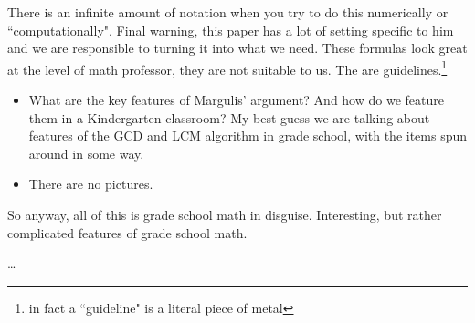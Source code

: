 \documentclass[12pt]{article}
\begin{document}
There is an infinite amount of notation when you try to do this numerically or ``computationally".  Final warning, this paper has a lot of setting specific to him and we are responsible to turning it into what we need. These formulas look great at the level of math professor, they are not suitable to us.  The are guidelines.\footnote{in fact a ``guideline" is a literal piece of metal} 
\begin{itemize}
\item What are the key features of Margulis' argument?  And how do we feature them in a Kindergarten classroom? My best guess we are talking about features of the GCD and LCM algorithm in grade school, with the items spun around in some way.
\item There are no pictures.
\end{itemize}
So anyway, all of this is grade school math in disguise.  Interesting, but rather complicated features of grade school math.





\vfill



\begin{thebibliography}{}

\item \dots 

\end{thebibliography}
\end{document}
